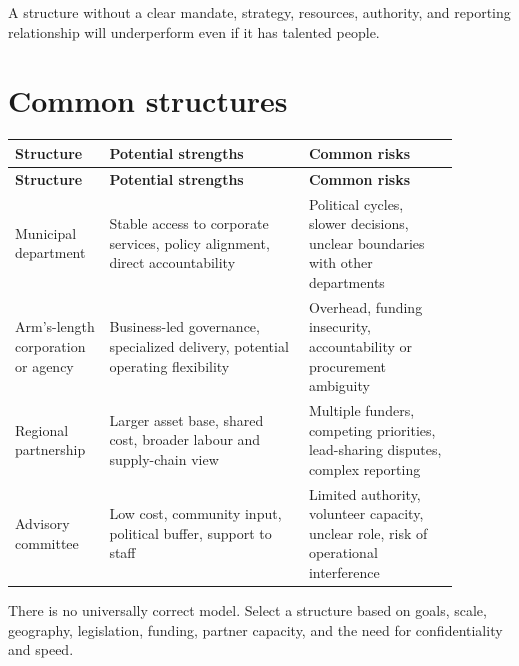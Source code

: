 \documentclass[11pt,letterpaper,oneside,openany]{book}
\begin{document}
A structure without a clear mandate, strategy, resources, authority, and reporting relationship will underperform even if it has talented people.


\section[Common structures]{Common structures}
\begin{center}
\small
\setlength{\LTpre}{0.4em}
\setlength{\LTpost}{0.8em}
\begin{longtable}{>{\RaggedRight\arraybackslash}p{0.180\linewidth}>{\RaggedRight\arraybackslash}p{0.400\linewidth}>{\RaggedRight\arraybackslash}p{0.300\linewidth}}
\rowcolor{DeepNavy}
\color{white}\bfseries Structure & \color{white}\bfseries Potential strengths & \color{white}\bfseries Common risks \\
\endfirsthead
\rowcolor{DeepNavy}
\color{white}\bfseries Structure & \color{white}\bfseries Potential strengths & \color{white}\bfseries Common risks \\
\endhead
Municipal department & Stable access to corporate services, policy alignment, direct accountability & Political cycles, slower decisions, unclear boundaries with other departments \\
Arm's-length corporation or agency & Business-led governance, specialized delivery, potential operating flexibility & Overhead, funding insecurity, accountability or procurement ambiguity \\
Regional partnership & Larger asset base, shared cost, broader labour and supply-chain view & Multiple funders, competing priorities, lead-sharing disputes, complex reporting \\
Advisory committee & Low cost, community input, political buffer, support to staff & Limited authority, volunteer capacity, unclear role, risk of operational interference \\
\end{longtable}
\end{center}
There is no universally correct model. Select a structure based on goals, scale, geography, legislation, funding, partner capacity, and the need for confidentiality and speed.


\end{document}
